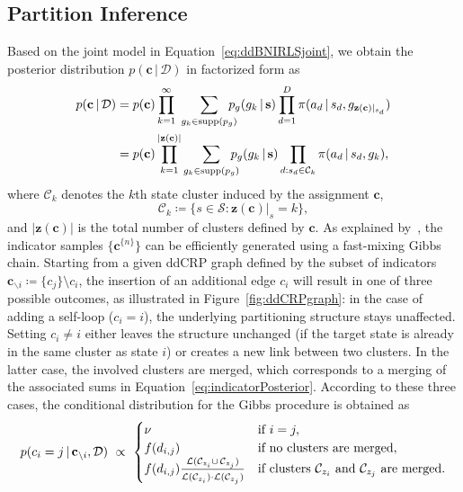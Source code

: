 \documentclass[twoside,11pt]{article}
\newcommand{\p}{p}
\newcommand{\given}{\,\vert\,}
\newcommand{\supp}{\text{supp}}
\newcommand{\softmax}{{\pi}}
\newcommand{\without}{\backslash}
\newcommand{\defeq}{\coloneqq}
\newcommand{\eqkomma}{,}
\newcommand{\eqpunkt}{.}
\begin{document}
\subsection{Partition Inference}
\label{sec:partitionInference}
%
%
%
%

%
%
Based on the joint model in Equation~\eqref{eq:ddBNIRLSjoint},
we %
obtain the posterior distribution $\p(\mathbf{c} \given \mathcal{D})$ in factorized form as
\begin{align}
	\p(\mathbf{c} \given \mathcal{D}) &= \p(\mathbf{c}) \prod_{k=1}^\infty \; \sum_{g_k\in\supp(p_g)} \hspace{-0.3cm} \p_g(g_k \given \mathbf{s}) \prod_{d=1}^D \softmax(a_d \given s_d, g_{\mathbf{z}(\mathbf{c})\vert_{s_d}}) \nonumber
	\\ & = \p(\mathbf{c}) \prod_{k=1}^{|\mathbf{z}(\mathbf{c})|} \sum_{g_k\in\supp(p_g)} \hspace{-0.3cm} \p_g(g_k \given \mathbf{s}) \prod_{d:s_d\in\mathcal{C}_k} \softmax(a_d \given s_d, g_k) \eqkomma
	\label{eq:indicatorPosterior}
\end{align}
where $\mathcal{C}_k$ denotes the $k$th state cluster induced by the assignment $\mathbf{c}$, \begin{equation}
\mathcal{C}_k\defeq\{s\in\mathcal{S}:\mathbf{z}(\mathbf{c})|_s=k\} \eqkomma
\label{eq:clusterDefinition}
\end{equation}and $|\mathbf{z}(\mathbf{c})|$ is the total number of clusters defined by $\mathbf{c}$. %
As explained by~\citet{blei2011distance}, the indicator samples $\{\mathbf{c}^{\{n\}}\}$ can be efficiently generated using a fast-mixing Gibbs chain. %
%
%
Starting from a given ddCRP graph defined by the subset of indicators~$\mathbf{c}_{\without i}\defeq\{c_j\}\setminus c_i$, the insertion of an additional edge $c_i$ will result in one of three possible outcomes, as illustrated in Figure~\ref{fig:ddCRPgraph}: in the case of adding a self-loop ($c_i=i$), %
the underlying partitioning structure %
stays unaffected. Setting $c_i \neq i$ either leaves the structure unchanged (if the target state is already in the same cluster as state $i$) or creates a new link between two clusters. In the latter case, the involved clusters are merged, which corresponds to a merging of the associated sums in Equation~\eqref{eq:indicatorPosterior}. %
According to these three cases, the conditional distribution for the Gibbs procedure is obtained as
\begin{equation}
	\p(c_i=j \given \mathbf{c}_{\without i}, \mathcal{D}) \ \propto \
	\begin{cases}
		\nu  & \text{if } i=j \eqkomma\\
		f(d_{i,j}) & \text{if no clusters are merged} \eqkomma \\
		f(d_{i,j}) \frac{\mathcal{L}(\mathcal{C}_{z_i}\cup\,\mathcal{C}_{z_j})}{\vphantom{\displaystyle |}\mathcal{L}(\mathcal{C}_{z_i})\cdot\mathcal{L}(\mathcal{C}_{z_j})} & \text{if clusters } \mathcal{C}_{z_i} \text{ and } \mathcal{C}_{z_j} \text{ are merged} \eqpunkt
	\end{cases}
	\label{eq:ddCRPposterior}
\end{equation}
\end{document}
